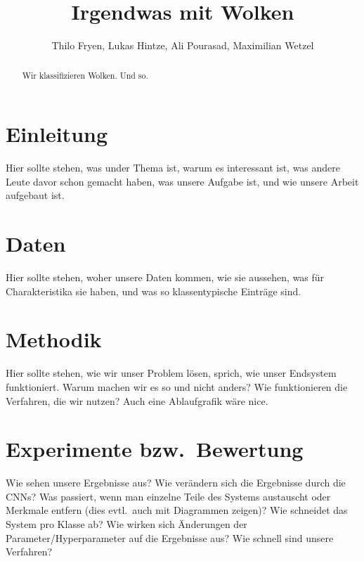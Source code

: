 \documentclass[a4,german]{article}
\begin{document}
\title{Irgendwas mit Wolken} %
\author{Thilo Fryen, Lukas Hintze, Ali Pourasad, Maximilian Wetzel} %

\maketitle %


\begin{abstract}
    Wir klassifizieren Wolken.
    Und so.
\end{abstract}

\section{Einleitung}

Hier sollte stehen, was under Thema ist, warum es interessant ist, was andere Leute davor schon gemacht haben,
was unsere Aufgabe ist, und wie unsere Arbeit aufgebaut ist.


\section{Daten}

Hier sollte stehen, woher unsere Daten kommen, wie sie aussehen, was für Charakteristika sie haben, und was so klassentypische Einträge sind.


\section{Methodik}

Hier sollte stehen, wie wir unser Problem lösen, sprich, wie unser Endsystem funktioniert.
Warum machen wir es so und nicht anders?
Wie funktionieren die Verfahren, die wir nutzen?
Auch eine Ablaufgrafik wäre nice.


\section{Experimente bzw.\ Bewertung}

Wie sehen unsere Ergebnisse aus?
Wie verändern sich die Ergebnisse durch die CNNs?
Was passiert, wenn man einzelne Teile des Systems austauscht oder Merkmale entfern (dies evtl.\ auch mit Diagrammen zeigen)?
Wie schneidet das System pro Klasse ab?
Wie wirken sich Änderungen der Parameter/Hyperpara\-meter auf die Ergebnisse aus?
Wie schnell sind unsere Verfahren?
\end{document}
